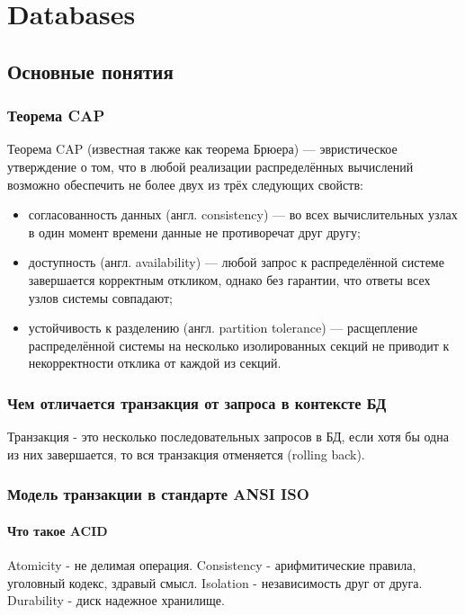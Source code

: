 \part{Databases}

\chapter{Основные понятия}

\section{Теорема CAP}

Теорема CAP (известная также как теорема Брюера) — эвристическое утверждение о том, что в любой реализации распределённых вычислений возможно обеспечить не более двух из трёх следующих свойств:
\begin{itemize}

\item согласованность данных (англ. consistency) — во всех вычислительных узлах в один момент времени данные не противоречат друг другу;
\item доступность (англ. availability) — любой запрос к распределённой системе завершается корректным откликом, однако без гарантии, что ответы всех узлов системы совпадают;
\item устойчивость к разделению (англ. partition tolerance) — расщепление распределённой системы на несколько изолированных секций не приводит к некорректности отклика от каждой из секций.

\end{itemize}

\section{Чем отличается транзакция от запроса в контексте БД}
Транзакция - это несколько последовательных запросов в БД, если хотя бы одна из них завершается, то вся транзакция отменяется (rolling back).

\section{Модель транзакции в стандарте ANSI ISO}
\subsection{Что такое ACID}

Atomicity - не делимая операция.
Consistency - арифмитические правила, уголовный кодекс, здравый смысл.
Isolation - независимость друг от друга.
Durability - диск надежное хранилище.

